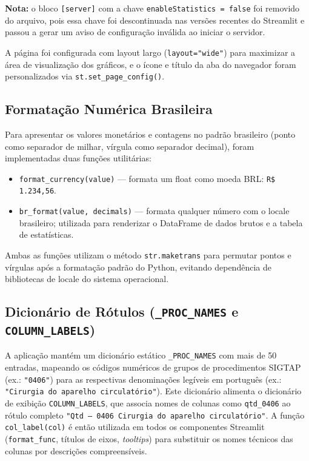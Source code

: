 \documentclass[12pt,a4paper]{report}
\begin{document}
\textbf{Nota:} o bloco \texttt{[server]} com a chave \texttt{enableStatistics = false}
foi removido do arquivo, pois essa chave foi descontinuada nas versões recentes do
Streamlit e passou a gerar um aviso de configuração inválida ao iniciar o servidor.

A página foi configurada com layout largo (\texttt{layout="wide"}) para maximizar a
área de visualização dos gráficos, e o ícone e título da aba do navegador foram
personalizados via \texttt{st.set\_page\_config()}.

\subsection{Formatação Numérica Brasileira}

Para apresentar os valores monetários e contagens no padrão brasileiro (ponto como
separador de milhar, vírgula como separador decimal), foram implementadas duas funções
utilitárias:

\begin{itemize}
    \item \texttt{format\_currency(value)} — formata um float como moeda BRL:
    \texttt{R\$ 1.234,56}.
    \item \texttt{br\_format(value, decimals)} — formata qualquer número com o locale
    brasileiro; utilizada para renderizar o DataFrame de dados brutos e a tabela de
    estatísticas.
\end{itemize}

Ambas as funções utilizam o método \texttt{str.maketrans} para permutar pontos e
vírgulas após a formatação padrão do Python, evitando dependência de bibliotecas de
locale do sistema operacional.

\subsection{Dicionário de Rótulos (\texttt{\_PROC\_NAMES} e \texttt{COLUMN\_LABELS})}

A aplicação mantém um dicionário estático \texttt{\_PROC\_NAMES} com mais de 50
entradas, mapeando os códigos numéricos de grupos de procedimentos SIGTAP
(ex.: \texttt{"0406"}) para as respectivas denominações legíveis em português
(ex.: \texttt{"Cirurgia do aparelho circulatório"}). Este dicionário alimenta o
dicionário de exibição \texttt{COLUMN\_LABELS}, que associa nomes de colunas como
\texttt{qtd\_0406} ao rótulo completo \texttt{"Qtd -- 0406 Cirurgia do aparelho
circulatório"}. A função \texttt{col\_label(col)} é então utilizada em todos os
componentes Streamlit (\texttt{format\_func}, títulos de eixos, \textit{tooltips})
para substituir os nomes técnicos das colunas por descrições compreensíveis.
\end{document}
